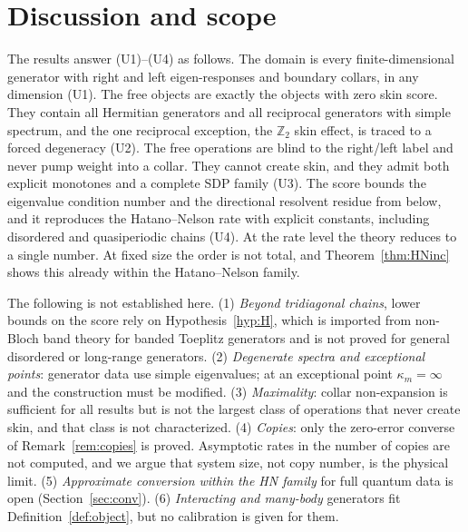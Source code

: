 \documentclass[11pt]{article}
\theoremstyle{definition}
\theoremstyle{remark}
\begin{document}
\section{Discussion and scope}
\label{sec:disc}

The results answer (U1)--(U4) as follows. The domain is every finite-dimensional generator with right and left eigen-responses and boundary collars, in any dimension (U1). The free objects are exactly the objects with zero skin score. They contain all Hermitian generators and all reciprocal generators with simple spectrum, and the one reciprocal exception, the $\mathbb Z_2$ skin effect, is traced to a forced degeneracy (U2). The free operations are blind to the right/left label and never pump weight into a collar. They cannot create skin, and they admit both explicit monotones and a complete SDP family (U3). The score bounds the eigenvalue condition number and the directional resolvent residue from below, and it reproduces the Hatano--Nelson rate with explicit constants, including disordered and quasiperiodic chains (U4). At the rate level the theory reduces to a single number. At fixed size the order is not total, and Theorem~\ref{thm:HNinc} shows this already within the Hatano--Nelson family.

The following is not established here.
(1) \emph{Beyond tridiagonal chains}, lower bounds on the score rely on Hypothesis~\ref{hyp:H}, which is imported from non-Bloch band theory for banded Toeplitz generators and is not proved for general disordered or long-range generators.
(2) \emph{Degenerate spectra and exceptional points}: generator data use simple eigenvalues; at an exceptional point $\kappa_m=\infty$ and the construction must be modified.
(3) \emph{Maximality}: collar non-expansion is sufficient for all results but is not the largest class of operations that never create skin, and that class is not characterized.
(4) \emph{Copies}: only the zero-error converse of Remark~\ref{rem:copies} is proved. Asymptotic rates in the number of copies are not computed, and we argue that system size, not copy number, is the physical limit.
(5) \emph{Approximate conversion within the HN family} for full quantum data is open (Section~\ref{sec:conv}).
(6) \emph{Interacting and many-body} generators fit Definition~\ref{def:object}, but no calibration is given for them.
\end{document}
